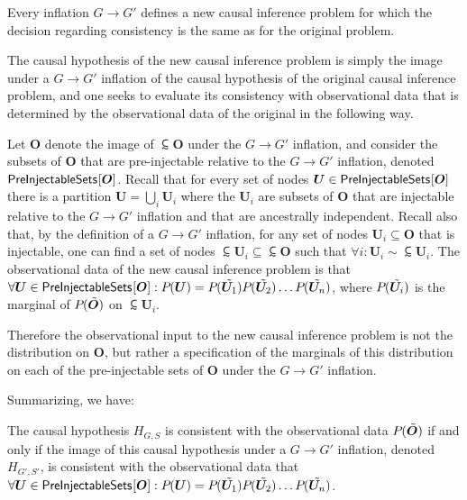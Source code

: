
Every inflation $G\to G'$
 defines a new causal inference problem for which the decision regarding consistency is the same as for the original problem.  

The causal hypothesis of the new causal inference problem is simply the image under a $G\to G'$ inflation of the causal hypothesis of the original causal inference problem, and one seeks to evaluate its consistency with observational data that is determined by the observational data of the original in the following way.

Let  $\bm{O}$ denote the image of $\subsim{\bm{O}}$ under the $G \to G'$ inflation, and consider the subsets of $\bm{O}$ that are pre-injectable relative to the $G \to G'$ inflation, denoted ${\operatorname{\mathsf{PreInjectableSets}}_{}}\lbrack\bm{O}\rbrack$.  Recall that for every set of nodes $\bm{U} \in {\operatorname{\mathsf{PreInjectableSets}}_{}}\lbrack\bm{O}\rbrack$ there is a partition $\bm{U} = \bigcup_i \bm{U}_i$ where the $\bm{U}_i$ are subsets of $\bm{O}$ that are injectable relative to the $G \to G'$ inflation and that are ancestrally independent.  Recall also that, by the definition of a $G\to G'$ inflation, for any set of nodes $\bm{U}_i \subseteq \bm{O}$ that is injectable, one can find a set of nodes $\subsim{\bm{U}}_i \subseteq \subsim{\bm{O}}$ such that $\forall  i: \bm{U}_i \sim \subsim{\bm{U}}_i$.  The observational data of the new causal inference problem is that $\forall \bm{U} \in {\operatorname{\mathsf{PreInjectableSets}}_{}}\lbrack\bm{O}\rbrack: {P_{}}\lparen\bm{U}\rparen = {P_{}}\lparen\tilde{\bm{U}_1}\rparen{P_{}}\lparen\tilde{\bm{U}_2}\rparen \dots {P_{}}\lparen\tilde{\bm{U}_n}\rparen$, where ${P_{}}\lparen\tilde{\bm{U}_i}\rparen$ is the marginal of ${P_{}}\lparen\tilde{\bm{O}}\rparen$ on $\subsim{\bm{U}_i}$.

Therefore the observational input to the new causal inference problem is not the distribution on $\bm{O}$, but rather a specification of the marginals of this distribution on each of the pre-injectable sets of $\bm{O}$ under the $G\to G'$ inflation.

Summarizing, we have:
\begin{lemma}
The causal hypothesis $H_{G,S}$ is consistent with the observational data ${P_{}}\lparen\tilde{\bm{O}}\rparen$ if and only if the image of this causal hypothesis under a $G\to G'$ inflation, denoted $H_{G',S'}$, is consistent with the observational data that $\forall \bm{U} \in {\operatorname{\mathsf{PreInjectableSets}}_{}}\lbrack\bm{O}\rbrack: {P_{}}\lparen\bm{U}\rparen = {P_{}}\lparen\tilde{\bm{U}_1}\rparen{P_{}}\lparen\tilde{\bm{U}_2}\rparen \dots {P_{}}\lparen\tilde{\bm{U}_n}\rparen$.
\label{mainlemma}
\end{lemma}

